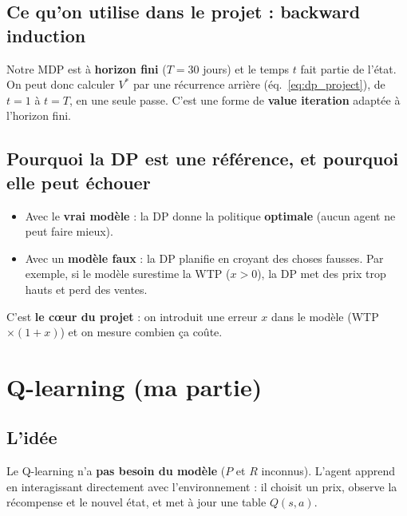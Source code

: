\documentclass[11pt,a4paper]{article}
\begin{document}
\subsection{Ce qu'on utilise dans le projet : backward induction}

Notre MDP est à \textbf{horizon fini} ($T = 30$ jours) et le temps $t$ fait partie de l'état. On peut donc calculer $V^*$ par une récurrence arrière (éq.~\ref{eq:dp_project}), de $t=1$ à $t=T$, en une seule passe. C'est une forme de \textbf{value iteration} adaptée à l'horizon fini.

\subsection{Pourquoi la DP est une référence, et pourquoi elle peut échouer}

\begin{itemize}[nosep]
  \item Avec le \textbf{vrai modèle} : la DP donne la politique \textbf{optimale} (aucun agent ne peut faire mieux).
  \item Avec un \textbf{modèle faux} : la DP planifie en croyant des choses fausses. Par exemple, si le modèle surestime la WTP ($x > 0$), la DP met des prix trop hauts et perd des ventes.
\end{itemize}

C'est \textbf{le cœur du projet} : on introduit une erreur $x$ dans le modèle (WTP $\times (1+x)$) et on mesure combien ça coûte.

\section{Q-learning (ma partie)}
\label{sec:qlearning}

\subsection{L'idée}

\begin{defbox}[C8, C10 — Q-learning = model-free, off-policy]
Le Q-learning n'a \textbf{pas besoin du modèle} ($P$ et $R$ inconnus). L'agent apprend en interagissant directement avec l'environnement : il choisit un prix, observe la récompense et le nouvel état, et met à jour une table $Q(s, a)$.
\end{defbox}
\end{document}
